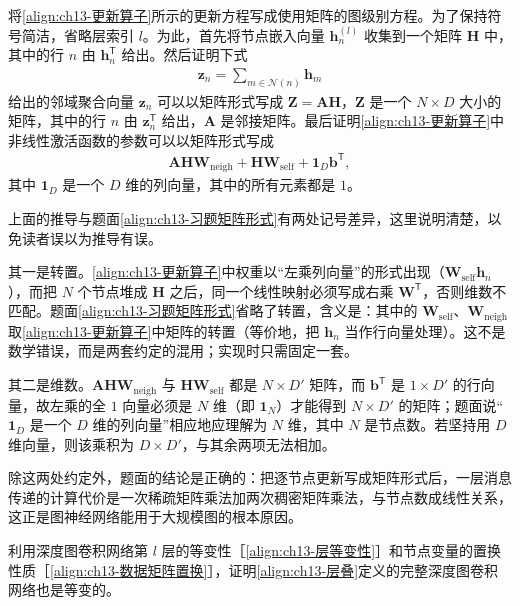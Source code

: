 \documentclass[../../main.tex]{subfiles}
\begin{document}
\begin{exercise}[$\star\star$]\label{exercise:ch13-06}
将\eqref{align:ch13-更新算子}所示的更新方程写成使用矩阵的图级别方程。为了保持符号简洁，省略层索引 $l$。为此，首先将节点嵌入向量 $\bm{h}_n^{(l)}$ 收集到一个矩阵 $\bm{H}$ 中，其中的行 $n$ 由 $\bm{h}_n^{\mathsf T}$ 给出。然后证明下式
\begin{align}
\bm{z}_n=\sum_{m\in\mathcal{N}(n)}\bm{h}_m
\label{align:ch13-习题聚合}
\end{align}
给出的邻域聚合向量 $\bm{z}_n$ 可以以矩阵形式写成 $\bm{Z}=\bm{A}\bm{H}$，$\bm{Z}$ 是一个 $N\times D$ 大小的矩阵，其中的行 $n$ 由 $\bm{z}_n^{\mathsf T}$ 给出，$\bm{A}$ 是邻接矩阵。最后证明\eqref{align:ch13-更新算子}中非线性激活函数的参数可以以矩阵形式写成
\begin{align}
\bm{A}\bm{H}\bm{W}_{\mathrm{neigh}}+\bm{H}\bm{W}_{\mathrm{self}}+\bm{1}_D\bm{b}^{\mathsf T},
\label{align:ch13-习题矩阵形式}
\end{align}
其中 $\bm{1}_D$ 是一个 $D$ 维的列向量，其中的所有元素都是 $1$。
\end{exercise}

\begin{remark}
上面的推导与题面\eqref{align:ch13-习题矩阵形式}有两处记号差异，这里说明清楚，以免读者误以为推导有误。\par
其一是转置。\eqref{align:ch13-更新算子}中权重以“左乘列向量”的形式出现（$\bm{W}_{\mathrm{self}}\bm{h}_n$），而把 $N$ 个节点堆成 $\bm{H}$ 之后，同一个线性映射必须写成右乘 $\bm{W}^{\mathsf T}$，否则维数不匹配。题面\eqref{align:ch13-习题矩阵形式}省略了转置，含义是：其中的 $\bm{W}_{\mathrm{self}}$、$\bm{W}_{\mathrm{neigh}}$ 取\eqref{align:ch13-更新算子}中矩阵的转置（等价地，把 $\bm{h}_n$ 当作行向量处理）。这不是数学错误，而是两套约定的混用；实现时只需固定一套。\par
其二是维数。$\bm{A}\bm{H}\bm{W}_{\mathrm{neigh}}$ 与 $\bm{H}\bm{W}_{\mathrm{self}}$ 都是 $N\times D'$ 矩阵，而 $\bm{b}^{\mathsf T}$ 是 $1\times D'$ 的行向量，故左乘的全 $1$ 向量必须是 $N$ 维（即 $\bm{1}_N$）才能得到 $N\times D'$ 的矩阵；题面说“$\bm{1}_D$ 是一个 $D$ 维的列向量”相应地应理解为 $N$ 维，其中 $N$ 是节点数。若坚持用 $D$ 维向量，则该乘积为 $D\times D'$，与其余两项无法相加。\par
除这两处约定外，题面的结论是正确的：把逐节点更新写成矩阵形式后，一层消息传递的计算代价是一次稀疏矩阵乘法加两次稠密矩阵乘法，与节点数成线性关系，这正是图神经网络能用于大规模图的根本原因。
\end{remark}

\begin{exercise}[$\star\star$]\label{exercise:ch13-07}
利用深度图卷积网络第 $l$ 层的等变性［\eqref{align:ch13-层等变性}］和节点变量的置换性质［\eqref{align:ch13-数据矩阵置换}］，证明\eqref{align:ch13-层叠}定义的完整深度图卷积网络也是等变的。
\end{exercise}
\end{document}

